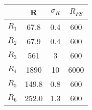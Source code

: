 \begin{center}
\begin{tabulary}{\textwidth}{CCCC}
\toprule
 & R & $\sigma_R$ & $R_{FS}$ \\ \midrule
$R_1$ & 67.8 & 0.4 & 600 \\ \midrule
$R_2$ & 67.9 & 0.4 & 600 \\ \midrule
$R_3$ & 561 & 3 & 600 \\ \midrule
$R_4$ & 1890 & 10 & 6000 \\ \midrule
$R_5$ & 149.8 & 0.8 & 600 \\ \midrule
$R_6$ & 252.0 & 1.3 & 600 \\ 
\bottomrule
\end{tabulary}
\end{center}
